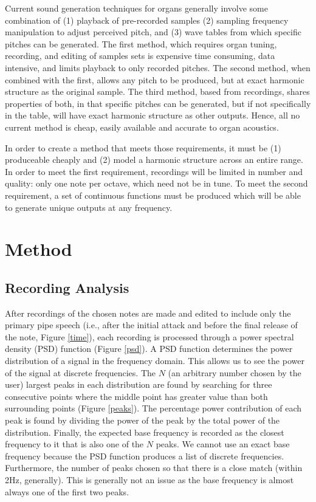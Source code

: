 \documentclass[twocolumn]{article}
\begin{document}
Current sound generation techniques for organs generally involve some combination of (1) playback of pre-recorded samples (2) sampling frequency manipulation to adjust perceived pitch, and (3) wave tables from which specific pitches can be generated. The first method, which requires organ tuning, recording, and editing of samples sets is expensive time consuming, data intensive, and limits playback to only recorded pitches. The second method, when combined with the first, allows any pitch to be produced, but at exact harmonic structure as the original sample. The third method, based from recordings, shares properties of both, in that specific pitches can be generated, but if not specifically in the table, will have exact harmonic structure as other outputs. Hence, all no current method is cheap, easily available and accurate to organ acoustics.

In order to create a method that meets those requirements, it must be (1) produceable cheaply and (2) model a harmonic structure across an entire range. In order to meet the first requirement, recordings will be limited in number and quality: only one note per octave, which need not be in tune. To meet the second requirement, a set of continuous functions must be produced which will be able to generate unique outputs at any frequency.

\section{Method}

\subsection{Recording Analysis}

After recordings of the chosen notes are made and edited to include only the primary pipe speech (i.e., after the initial attack and before the final release of the note, Figure \ref{time}), each recording is processed through a power spectral density (PSD) function (Figure \ref{psd}). A PSD function determines the power distribution of a signal in the frequency domain. This allows us to see the power of the signal at discrete frequencies. The $N$ (an arbitrary number chosen by the user) largest peaks in each distribution are found by searching for three consecutive points where the middle point has greater value than both surrounding points (Figure \ref{peaks}). The percentage power contribution of each peak is found by dividing the power of the peak by the total power of the distribution. Finally, the expected base frequency is recorded as the closest frequency to it that is also one of the $N$ peaks. We cannot use an exact base frequency because the PSD function produces a list of discrete frequencies. Furthermore, the number of peaks chosen so that there is a close match (within 2Hz, generally). This is generally not an issue as the base frequency is almost always one of the first two peaks.
\end{document}
